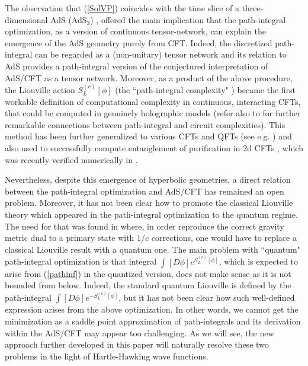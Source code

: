 \documentclass[a4paper,12pt]{article}
\begin{document}
The observation that  (\ref{SolVP}) coincides with the time slice of a three-dimensional AdS (AdS$_3$)  \cite{Caputa:2017urj}, offered the main implication that the path-integral optimization, as a version of continuous tensor-network, can explain the emergence of the AdS geometry purely from CFT. Indeed, the discretized path-integral can be regarded as a (non-unitary) tensor network and its relation to AdS provides a path-integral version of the conjectured interpretation of AdS/CFT as a tensor network. Moreover, as a product of the above procedure, the Liouville action $S^{(e)}_L[\phi]$ (the ``path-integral complexity" \cite{Caputa:2017urj}) became the first workable definition of computational complexity in continuous, interacting CFTs, that could be computed in genuinely holographic models \cite{Susskind} (refer also to \cite{Czech:2017ryf,Caputa:2018kdj,Camargo:2019isp,Erdmenger:2020sup,Chagnet:2021uvi} for further remarkable connections between path-integral and circuit complexities). This method has been further generalized to various CFTs and QFTs (see e.g. \cite{Bhattacharyya:2018wym,Sato:2019kik,Caputa:2020mgb,Molina-Vilaplana:2018sfn,Jafari:2019qns,Ghodrati:2019bzz,Ahmadain:2020jfm,Yang:2020tna,Chandra:2021kdv}) and also used to successfully compute entanglement of purification in 2d CFTs \cite{Caputa:2018xuf}, which was recently verified numerically in \cite{Camargo:2020yfv}.

Nevertheless, despite this emergence of hyperbolic geometries, a direct relation between the path-integral optimization and AdS/CFT has remained an open problem. Moreover, it has not been clear how to promote the classical Liouville theory which appeared in the path-integral optimization to the quantum regime. The need for that was found in \cite{Caputa:2017urj} where, in order reproduce the correct gravity metric dual to a primary state with $1/c$ corrections, one would have to replace a classical Liouville result with a quantum one. The main problem with ``quantum" path-integral optimization is that integral $\int [D\phi] e^{S^{(e)}_L[\phi]}$, which is expected to arise from (\ref{pathinf}) in the quantized version, does not make sense as it is not bounded from below. Indeed, the standard quantum Liouville is defined by the path-integral  $\int [D\phi] e^{-S^{(e)}_L[\phi]}$, but it has not been clear how such well-defined expression arises from the above optimization. In other words, we cannot get the minimization as a saddle point approximation of path-integrals and its derivation within the AdS/CFT may appear too challenging. As we will see, the new approach \cite{Boruch:2020wax} further developed in this paper will naturally resolve these two problems in the light of Hartle-Hawking wave functions.
\end{document}
